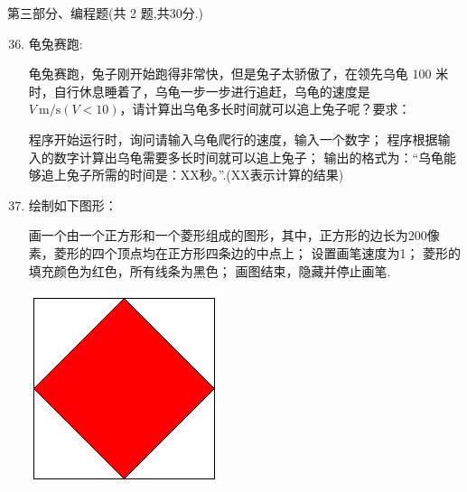 \documentclass[11pt]{ctexart}
\begin{document}
    \newpage
    {\noindent\heiti 第三部分、编程题(共 2 题,共30分.)}
    \begin{enumerate}
        \setcounter{enumi}{35}
        
        \item 龟兔赛跑:
        
        龟兔赛跑，兔子刚开始跑得非常快，但是兔子太骄傲了，在领先乌龟 $100$ 米时，自行休息睡着了，乌龟一步一步进行追赶，乌龟的速度是 $V\ \mathrm{m/s}(V<10)$，请计算出乌龟多长时间就可以追上兔子呢？要求：
        \begin{tasks}[label=(\arabic*)]
            \task 程序开始运行时，询问请输入乌龟爬行的速度，输入一个数字；
            \task 程序根据输入的数字计算出乌龟需要多长时间就可以追上兔子；
            \task 输出的格式为：“乌龟能够追上兔子所需的时间是：XX秒。”.(XX表示计算的结果)
        \end{tasks}
        \vfill

        \item 绘制如下图形：
        
        \begin{tasks}[label=(\arabic*)]
            \task 画一个由一个正方形和一个菱形组成的图形，其中，正方形的边长为200像素，菱形的四个顶点均在正方形四条边的中点上；
            \task 设置画笔速度为1；
            \task 菱形的填充颜色为红色，所有线条为黑色；
            \task 画图结束，隐藏并停止画笔.
        \end{tasks}
        \begin{center}
            \includegraphics[width=.1\textwidth]{37.png}
        \end{center}
        \vfill
    \end{enumerate}
\end{document}
